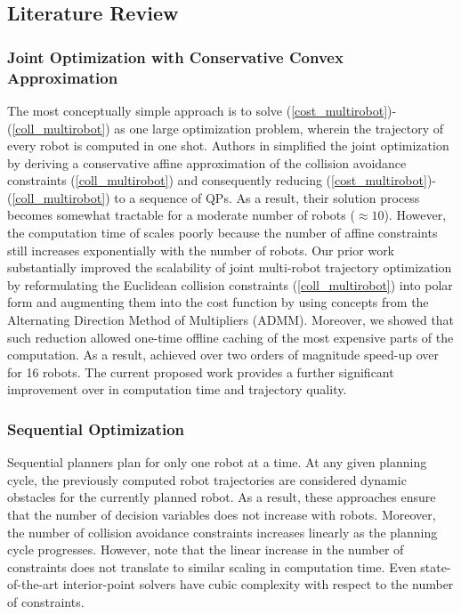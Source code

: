 \subsection{Literature Review}
\subsubsection{Joint Optimization with Conservative Convex Approximation}
\noindent The most conceptually simple approach is to solve (\ref{cost_multirobot})-(\ref{coll_multirobot}) as one large optimization problem, wherein the trajectory of every robot is computed in one shot. Authors in \citep{rafaella_scp} simplified the joint optimization by deriving a conservative affine approximation of the collision avoidance constraints (\ref{coll_multirobot}) and consequently reducing  (\ref{cost_multirobot})-(\ref{coll_multirobot}) to a sequence of QPs. As a result, their solution process becomes somewhat tractable for a moderate number of robots ($\approx 10$). However, the computation time of \citep{rafaella_scp} scales poorly because the number of affine constraints still increases exponentially with the number of robots. Our prior work \citep{aks_ral21} substantially improved the scalability of joint multi-robot trajectory optimization by reformulating the Euclidean collision constraints (\ref{coll_multirobot}) into polar form and augmenting them into the cost function by using concepts from the Alternating Direction Method of Multipliers (ADMM). Moreover, we showed that such reduction allowed one-time offline caching of the most expensive parts of the computation. As a result, \citep{aks_ral21} achieved over two orders of magnitude speed-up over \citep{rafaella_scp} for 16 robots. The current proposed work provides a further significant improvement over \citep{aks_ral21} in computation time and trajectory quality.

\subsubsection{Sequential Optimization}

Sequential planners plan for only one robot at a time. At any given planning cycle, the previously computed robot trajectories are considered dynamic obstacles for the currently planned robot. As a result, these approaches ensure that the number of decision variables does not increase with robots. Moreover, the number of collision avoidance constraints increases linearly as the planning cycle progresses. However, note that the linear increase in the number of constraints does not translate to similar scaling in computation time. Even state-of-the-art interior-point solvers have cubic complexity with respect to the number of constraints.

